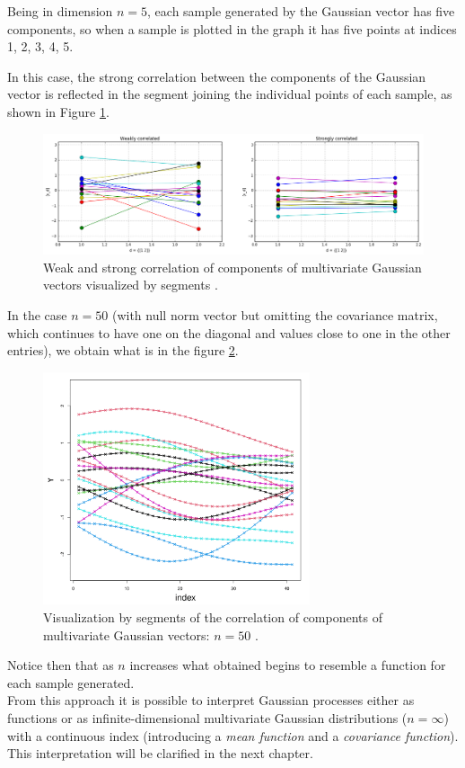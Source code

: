 Being in dimension $n=5$, each sample generated by the Gaussian vector has five components, so when a sample is plotted in the graph it has five points at indices 1, 2, 3, 4, 5.
\newpage

In this case, the strong correlation between the components of the Gaussian vector is reflected in the segment joining the individual points of each sample, as shown in Figure \ref{SegmentCorrelation}.

\begin{figure}[h]
    \centering
    \includegraphics[width=1\textwidth]{images/Gaussiane/CorrelazioneUnidimensionale.png}
    \caption{Weak and strong correlation of components of multivariate Gaussian vectors visualized by segments \cite{damianou_gaussian_2016}.}
    \label{SegmentCorrelation}
\end{figure}

In the case $n=50$ (with null norm vector but omitting the covariance matrix, which continues to have one on the diagonal and values close to one in the other entries), we obtain what is in the figure \ref{correlazione6}.


\begin{figure}[h]
    \centering
    \includegraphics[width=0.7\textwidth]{images/Gaussiane/CorrelazioneMultidimensionale3.png}
    \caption{Visualization by segments of the correlation of components of multivariate Gaussian vectors: $n=50$ \cite{wilkinson_introduction_2020}.}
    \label{correlazione6}
\end{figure}

Notice then that as $n$ increases what obtained begins to resemble a function for each sample generated.\\
From this approach it is possible to interpret Gaussian processes either as functions or as infinite-dimensional multivariate Gaussian distributions ($n=\infty$) with a continuous index (introducing a \textit{mean function} and a \textit{covariance function}). This interpretation will be clarified in the next chapter.